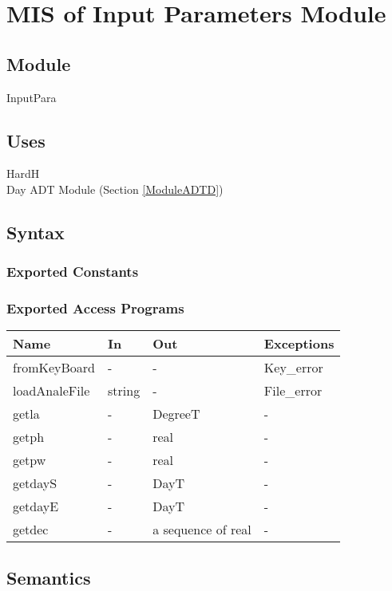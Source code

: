 \documentclass[12pt, titlepage]{article}
\begin{document}
\section{MIS of Input Parameters Module} \label{ModuleIP} 

\subsection{Module}
InputPara

\subsection{Uses}
HardH\\
Day ADT Module (Section \ref{ModuleADTD})

\subsection{Syntax}

\subsubsection{Exported Constants}


\subsubsection{Exported Access Programs}

\begin{center}
\begin{tabular}{p{4cm} p{2cm} p{4cm} p{2cm}}
\hline
\textbf{Name} & \textbf{In} & \textbf{Out} & \textbf{Exceptions} \\
\hline 
fromKeyBoard & - & - & Key\_error \\
loadAnaleFile & string & - & File\_error \\
getla & - & DegreeT & - \\
getph & - & real & - \\
getpw & - & real & - \\
getdayS & - & DayT & - \\
getdayE & - & DayT & - \\
getdec & - & a sequence of real & - \\


\hline
\end{tabular}
\end{center}


\subsection{Semantics}
\end{document}
